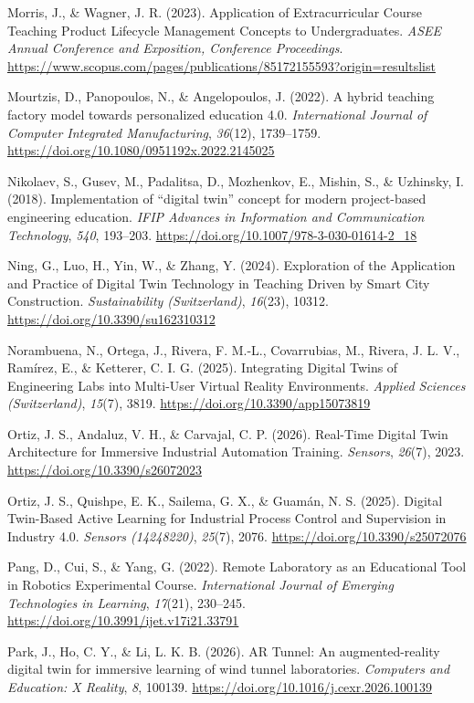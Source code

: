 Morris, J., \& Wagner, J. R. (2023). Application of Extracurricular
Course Teaching Product Lifecycle Management Concepts to Undergraduates.
\emph{ASEE Annual Conference and Exposition, Conference Proceedings}.
\url{https://www.scopus.com/pages/publications/85172155593?origin=resultslist}

Mourtzis, D., Panopoulos, N., \& Angelopoulos, J. (2022). A hybrid
teaching factory model towards personalized education 4.0.
\emph{International Journal of Computer Integrated Manufacturing}, \emph{36}(12),
1739--1759. \url{https://doi.org/10.1080/0951192x.2022.2145025}

Nikolaev, S., Gusev, M., Padalitsa, D., Mozhenkov, E., Mishin, S., \&
Uzhinsky, I. (2018). Implementation of ``digital twin'' concept for modern
project-based engineering education. \emph{IFIP Advances in Information and
Communication Technology}, \emph{540}, 193--203.
\url{https://doi.org/10.1007/978-3-030-01614-2_18}

Ning, G., Luo, H., Yin, W., \& Zhang, Y. (2024). Exploration of the
Application and Practice of Digital Twin Technology in Teaching Driven
by Smart City Construction. \emph{Sustainability (Switzerland)}, \emph{16}(23),
10312. \url{https://doi.org/10.3390/su162310312}

Norambuena, N., Ortega, J., Rivera, F. M.-L., Covarrubias, M., Rivera,
J. L. V., Ramírez, E., \& Ketterer, C. I. G. (2025). Integrating Digital
Twins of Engineering Labs into Multi-User Virtual Reality Environments.
\emph{Applied Sciences (Switzerland)}, \emph{15}(7), 3819.
\url{https://doi.org/10.3390/app15073819}

Ortiz, J. S., Andaluz, V. H., \& Carvajal, C. P. (2026). Real-Time
Digital Twin Architecture for Immersive Industrial Automation Training.
\emph{Sensors}, \emph{26}(7), 2023. \url{https://doi.org/10.3390/s26072023}

Ortiz, J. S., Quishpe, E. K., Sailema, G. X., \& Guamán, N. S. (2025).
Digital Twin-Based Active Learning for Industrial Process Control and
Supervision in Industry 4.0. \emph{Sensors (14248220)}, \emph{25}(7), 2076.
\url{https://doi.org/10.3390/s25072076}

Pang, D., Cui, S., \& Yang, G. (2022). Remote Laboratory as an
Educational Tool in Robotics Experimental Course. \emph{International Journal
of Emerging Technologies in Learning}, \emph{17}(21), 230--245.
\url{https://doi.org/10.3991/ijet.v17i21.33791}

Park, J., Ho, C. Y., \& Li, L. K. B. (2026). AR Tunnel: An
augmented-reality digital twin for immersive learning of wind tunnel
laboratories. \emph{Computers and Education: X Reality}, \emph{8}, 100139.
\url{https://doi.org/10.1016/j.cexr.2026.100139}

